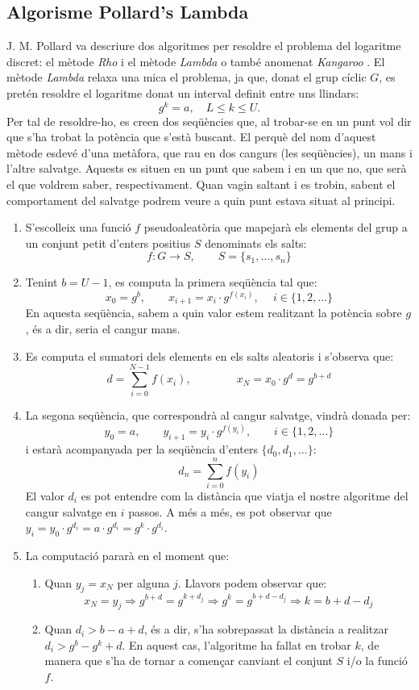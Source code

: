 \documentclass{article}
\begin{document}
\subsection{Algorisme Pollard's Lambda}\label{sec:pollards}
J. M. Pollard \cite{pollard} va descriure dos algoritmes per resoldre el problema del logaritme discret: el mètode \textit{Rho} i el mètode \textit{Lambda} o també anomenat \textit{Kangaroo} \cite{kangaroo}. El mètode \textit{Lambda } relaxa una mica el problema, ja que, donat el grup cíclic $G$, es pretén resoldre el logaritme donat un interval definit entre uns llindars:
\[g^k = a, \quad L \le k \le U.\]
Per tal de resoldre-ho, es creen dos seqüències que, al trobar-se en un punt vol dir que s'ha trobat la potència que s'està buscant. El perquè del nom d'aquest mètode esdevé d'una metàfora, que rau en dos cangurs (les seqüències), un mans i l'altre salvatge. Aquests es situen en un punt que sabem i en un que no, que serà el que voldrem saber, respectivament. Quan vagin saltant i es trobin, sabent el comportament del salvatge podrem veure a quin punt estava situat al principi.
\begin{enumerate}
	\item S'escolleix una funció $f$ pseudoaleatòria que mapejarà els elements del grup a un conjunt petit d'enters positius $S$ denominats els salts:
	\[f : G \rightarrow S, \qquad S = \{s_1, \dots, s_n\}\]
	\item Tenint $b = U - 1$, es computa la primera seqüència tal que:
	\[x_0 = g^b, \qquad x_{i+1} = x_i \cdot g^{f(x_i)}, \quad \ i \in \{1, 2, \dots\}\]
	En aquesta seqüència, sabem a quin valor estem realitzant la potència sobre $g$, és a dir, seria el cangur mans.
	\item Es computa el sumatori dels elements en els salts aleatoris i s'observa que:
	\[d = \sum_{i=0}^{N - 1} f(x_i) ,  \qquad \qquad x_N = x_0 \cdot g^d = g^{b + d}\]
	\item La segona seqüència, que correspondrà al cangur salvatge, vindrà donada per:
	\[y_0 = a, \qquad y_{i+1} = y_i \cdot g^{f(y_i)}, \qquad i \in \{1, 2, \dots\}\]
	i estarà acompanyada per la seqüència d'enters $\{d_0, d_1, \dots \}$:
	\[d_n = \sum_{i=0}^{n}f(y_i)\]
	El valor $d_i$ es pot entendre com la distància que viatja el nostre algoritme del cangur salvatge en $i$ passos. A més a més, es pot observar que $y_i = y_0 \cdot g^{d_i} = a \cdot g^{d_i} = g^{k} \cdot g^{d_i}$.
	\item La computació pararà en el moment que:
	\begin{enumerate}[label=(\Alph*)]
		\item Quan $y_j = x_N$ per alguna $j$. Llavors podem observar que:
		\[x_N = y_j \Longrightarrow g^{b + d} = g^{k + d_j} \Longrightarrow g^k = g^{b + d - d_j} \Longrightarrow k = b + d - d_j\]
		\item Quan $d_i > b - a + d $, és a dir, s'ha sobrepassat la distància a realitzar $d_i > g^b - g^k + d$. En aquest cas, l'algoritme ha fallat en trobar $k$, de manera que s'ha de tornar a començar canviant el conjunt $S$ i/o la funció $f$.
	\end{enumerate}
\end{enumerate}
\end{document}
